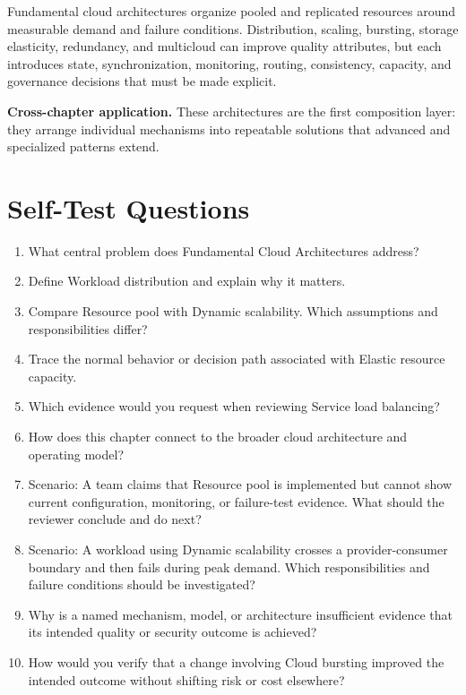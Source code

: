 \documentclass[11pt]{article}
\begin{document}
\begin{synthesisbox}
Fundamental cloud architectures organize pooled and replicated resources around measurable demand and failure conditions. Distribution, scaling, bursting, storage elasticity, redundancy, and multicloud can improve quality attributes, but each introduces state, synchronization, monitoring, routing, consistency, capacity, and governance decisions that must be made explicit.
\par\smallskip
\textbf{Cross-chapter application.} These architectures are the first composition layer: they arrange individual mechanisms into repeatable solutions that advanced and specialized patterns extend.
\end{synthesisbox}
\section{Self-Test Questions}
\begin{enumerate}
\item What central problem does Fundamental Cloud Architectures address?
\item Define Workload distribution and explain why it matters.
\item Compare Resource pool with Dynamic scalability. Which assumptions and responsibilities differ?
\item Trace the normal behavior or decision path associated with Elastic resource capacity.
\item Which evidence would you request when reviewing Service load balancing?
\item How does this chapter connect to the broader cloud architecture and operating model?
\item Scenario: A team claims that Resource pool is implemented but cannot show current configuration, monitoring, or failure-test evidence. What should the reviewer conclude and do next?
\item Scenario: A workload using Dynamic scalability crosses a provider-consumer boundary and then fails during peak demand. Which responsibilities and failure conditions should be investigated?
\item Why is a named mechanism, model, or architecture insufficient evidence that its intended quality or security outcome is achieved?
\item How would you verify that a change involving Cloud bursting improved the intended outcome without shifting risk or cost elsewhere?
\end{enumerate}
\clearpage
\end{document}
